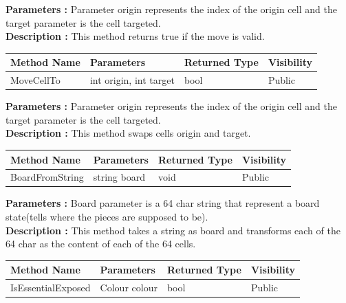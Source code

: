 \documentclass[12pt]{article}
\begin{document}
\textbf{Parameters :} Parameter origin represents the index of
the origin cell and the target parameter is the cell targeted.
\\

\textbf{Description :} This method returns true if the move is valid.

\begin{table}[H]
    \begin{tabular}{|l|l|l|l|}
    \hline
    \rowcolor[HTML]{EFEFEF} 
    \cellcolor[HTML]{EFEFEF}\textbf{Method Name} & \textbf{Parameters}     & \textbf{Returned Type} & \textbf{Visibility} \\ \hline
    MoveCellTo                                   & int origin, int target  & bool                   & Public              \\ \hline
    \end{tabular}
\end{table}

\textbf{Parameters :} Parameter origin represents the index of
the origin cell and the target parameter is the cell targeted.
\\

\textbf{Description :} This method swaps cells origin and target.

\begin{table}[H]
    \begin{tabular}{|l|l|l|l|}
    \hline
    \rowcolor[HTML]{EFEFEF} 
    \cellcolor[HTML]{EFEFEF}\textbf{Method Name} & \textbf{Parameters}     & \textbf{Returned Type} & \textbf{Visibility} \\ \hline
    BoardFromString                              & string board            & void                   & Public              \\ \hline
    \end{tabular}
\end{table}

\textbf{Parameters :} Board parameter is a 64 char string that represent
a board state(tells where the pieces are supposed to be).
\\

\textbf{Description :} This method takes a string as board and transforms
each of the 64 char as the content of each of the 64 cells.

\begin{table}[H]
    \begin{tabular}{|l|l|l|l|}
    \hline
    \rowcolor[HTML]{EFEFEF} 
    \cellcolor[HTML]{EFEFEF}\textbf{Method Name} & \textbf{Parameters}     & \textbf{Returned Type} & \textbf{Visibility} \\ \hline
    IsEssentialExposed                           & Colour colour           & bool                   & Public              \\ \hline
    \end{tabular}
\end{table}
\end{document}
